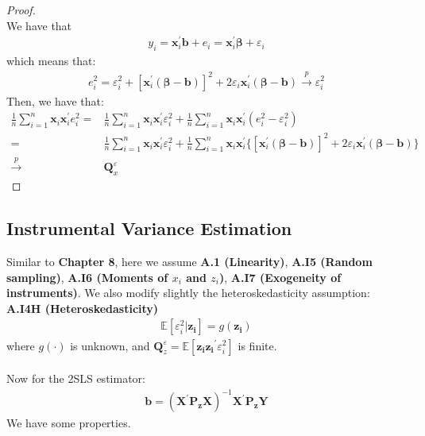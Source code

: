 \documentclass{article}
\begin{document}
	\begin{proof}
		\mbox{}\\
		We have that
			\begin{align*}
				y_i = \boldsymbol{x}^\prime_i \boldsymbol{b} + e_i = \boldsymbol{x}^\prime_i \boldsymbol{\beta} + \varepsilon_i
			\end{align*}
		which means that:
			\begin{align*}
				e^2_i = \varepsilon^2_i + [\boldsymbol{x}^\prime_i (\boldsymbol{\beta} - \boldsymbol{b})]^2 + 2\varepsilon_i \boldsymbol{x}^\prime_i (\boldsymbol{\beta} - \boldsymbol{b}) \xrightarrow{p} \varepsilon^2_i
			\end{align*}
		Then, we have that:
			\begin{align*}
				\frac{1}{n} \sum^n_{i=1} \boldsymbol{x}_i \boldsymbol{x}^\prime_i e^2_i = &\frac{1}{n} \sum^n_{i=1} \boldsymbol{x}_i \boldsymbol{x}^\prime_i \varepsilon^2_i + \frac{1}{n} \sum^n_{i=1} \boldsymbol{x}_i \boldsymbol{x}^\prime_i (e^2_i - \varepsilon^2_i)\\ = &
				\frac{1}{n} \sum^n_{i=1} \boldsymbol{x}_i \boldsymbol{x}^\prime_i \varepsilon^2_i + \frac{1}{n} \sum^n_{i=1} \boldsymbol{x}_i \boldsymbol{x}^\prime_i \{ [\boldsymbol{x}^\prime_i (\boldsymbol{\beta} - \boldsymbol{b})]^2 + 2\varepsilon_i \boldsymbol{x}^\prime_i (\boldsymbol{\beta} - \boldsymbol{b}) \}\\ \xrightarrow{p} &
				\boldsymbol{Q}^\varepsilon_x
			\end{align*}
	\end{proof}


\subsection{Instrumental Variance Estimation}
Similar to \textbf{Chapter 8}, here we assume \textbf{A.1 (Linearity)}, \textbf{A.I5 (Random sampling)}, \textbf{A.I6 (Moments of $x_i$ and $z_i$)}, \textbf{A.I7 (Exogeneity of instruments)}. We also modify slightly the heteroskedasticity assumption:\\
\textbf{A.I4H (Heteroskedasticity)}\\
	\begin{align*}
		\mathbb{E}[\varepsilon^2_i | \boldsymbol{z_i}] = g(\boldsymbol{z_i})
	\end{align*}  
where $g(\cdot)$ is unknown, and $\boldsymbol{Q}^\varepsilon_z = \mathbb{E}[\boldsymbol{z_i} \boldsymbol{z_i}^\prime \varepsilon^2_i]$ is finite.\\\\
Now for the 2SLS estimator:
	\begin{align*}
		\boldsymbol{b} = (\boldsymbol{X}^\prime \boldsymbol{P_z} \boldsymbol{X})^{-1} \boldsymbol{X}^\prime \boldsymbol{P_z} \boldsymbol{Y}
	\end{align*}
We have some properties.
\end{document}
